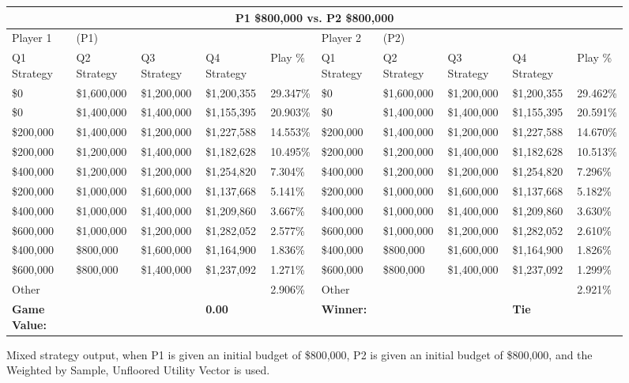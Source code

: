\documentclass[11pt]{article}
\begin{document}
\begin{figure}
\tiny
\begin{tabular}{ |p{1.0cm}p{1.0cm}p{1.0cm}p{2.0cm}|p{1.0cm}||p{1.0cm}p{1.0cm}p{1.0cm}p{2.0cm}|p{1.0cm}|}
\hline
\multicolumn{10}{|c|}{P1 \$800,000 vs. P2 \$800,000} \\
\hline
Player 1 & (P1) & & & & Player 2 & (P2) & & & \\
\hline
Q1 Strategy & Q2 Strategy & Q3 Strategy & Q4 Strategy  &  Play \% & Q1 Strategy & Q2 Strategy & Q3 Strategy & Q4 Strategy  &  Play \%\\
\hline
\$0 & \$1,600,000 & \$1,200,000 & \$1,200,355 & 29.347\% & \$0 & \$1,600,000 & \$1,200,000 & \$1,200,355 & 29.462\% \\
\$0 & \$1,400,000 & \$1,400,000 & \$1,155,395 & 20.903\% & \$0 & \$1,400,000 & \$1,400,000 & \$1,155,395 & 20.591\% \\
\$200,000 & \$1,400,000 & \$1,200,000 & \$1,227,588 & 14.553\% & \$200,000 & \$1,400,000 & \$1,200,000 & \$1,227,588 & 14.670\% \\
\$200,000 & \$1,200,000 & \$1,400,000 & \$1,182,628 & 10.495\% & \$200,000 & \$1,200,000 & \$1,400,000 & \$1,182,628 & 10.513\% \\
\$400,000 & \$1,200,000 & \$1,200,000 & \$1,254,820 & 7.304\% & \$400,000 & \$1,200,000 & \$1,200,000 & \$1,254,820 & 7.296\% \\
\$200,000 & \$1,000,000 & \$1,600,000 & \$1,137,668 & 5.141\% & \$200,000 & \$1,000,000 & \$1,600,000 & \$1,137,668 & 5.182\% \\
\$400,000 & \$1,000,000 & \$1,400,000 & \$1,209,860 & 3.667\% & \$400,000 & \$1,000,000 & \$1,400,000 & \$1,209,860 & 3.630\% \\
\$600,000 & \$1,000,000 & \$1,200,000 & \$1,282,052 & 2.577\% & \$600,000 & \$1,000,000 & \$1,200,000 & \$1,282,052 & 2.610\% \\
\$400,000 & \$800,000 & \$1,600,000 & \$1,164,900 & 1.836\% & \$400,000 & \$800,000 & \$1,600,000 & \$1,164,900 & 1.826\% \\
\$600,000 & \$800,000 & \$1,400,000 & \$1,237,092 & 1.271\% & \$600,000 & \$800,000 & \$1,400,000 & \$1,237,092 & 1.299\% \\
\hline
Other &&&& 2.906\% & Other &&&& 2.921\% \\
\hline
\small \textbf{Game Value:} &&& \small \textbf{0.00} && \small \textbf{Winner:} &&& \small \textbf{Tie}&\\
\hline
\end{tabular}
\caption{Mixed strategy output, when P1 is given an initial budget of \$800,000, P2 is given an initial budget of \$800,000, and the Weighted by Sample, Unfloored Utility Vector is used.}
\label{8v8table.6}
\end{figure}
\end{document}
